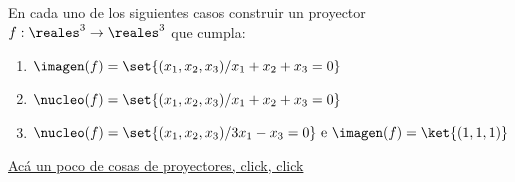 \begin{enunciado}{\ejercicio}
  En cada uno de los siguientes casos construir un proyector $f:\reales^3 \to \reales^3$ que cumpla:
  \begin{enumerate}[label=(\roman*)]
    \item $\imagen(f) = \set{(x_1,x_2,x_3) / x_1 + x_2 + x_3 = 0 }$
    \item $\nucleo(f) = \set{(x_1,x_2,x_3) / x_1 + x_2 + x_3 = 0 }$
    \item $\nucleo(f) = \set{(x_1,x_2,x_3) / 3x_1 - x_3 = 0 } \text{ e } \imagen(f) = \ket{(1,1,1)}$
  \end{enumerate}
\end{enunciado}

\hyperlink{teoria-3:proyector}{Acá un poco de cosas de proyectores, click, click {\tiny{}}}

